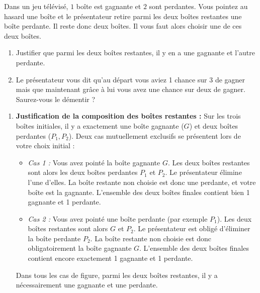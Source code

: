 \documentclass[11pt,a4paper]{article}
\begin{document}
Dans un jeu télévisé, $1$ boîte est gagnante et $2$ sont perdantes. Vous pointez au hasard une boîte et le présentateur retire parmi les deux boîtes restantes une boîte perdante. Il reste donc deux boîtes. Il vous faut alors choisir une de ces deux boîtes.
\begin{enumerate}[label=\arabic*.]
    \item Justifier que parmi les deux boîtes restantes, il y en a une gagnante et l'autre perdante.
    \item Le présentateur vous dit qu'au départ vous aviez 1 chance sur 3 de gagner mais que maintenant grâce à lui vous avez une chance sur deux de gagner. Saurez-vous le démentir ?
\end{enumerate}

\begin{correctionbox}
\begin{enumerate}[label=\arabic*.]
    \item \textbf{Justification de la composition des boîtes restantes :}
    Sur les trois boîtes initiales, il y a exactement une boîte gagnante ($G$) et deux boîtes perdantes ($P_1, P_2$).
    Deux cas mutuellement exclusifs se présentent lors de votre choix initial :
    \begin{itemize}[label=$\bullet$]
        \item \emph{Cas 1 :} Vous avez pointé la boîte gagnante $G$. Les deux boîtes restantes sont alors les deux boîtes perdantes $P_1$ et $P_2$. Le présentateur élimine l'une d'elles. La boîte restante non choisie est donc une perdante, et votre boîte est la gagnante. L'ensemble des deux boîtes finales contient bien 1 gagnante et 1 perdante.
        \item \emph{Cas 2 :} Vous avez pointé une boîte perdante (par exemple $P_1$). Les deux boîtes restantes sont alors $G$ et $P_2$. Le présentateur est obligé d'éliminer la boîte perdante $P_2$. La boîte restante non choisie est donc obligatoirement la boîte gagnante $G$. L'ensemble des deux boîtes finales contient encore exactement 1 gagnante et 1 perdante.
    \end{itemize}
    Dans tous les cas de figure, parmi les deux boîtes restantes, il y a nécessairement une gagnante et une perdante.


\end{enumerate}
\end{correctionbox}
\end{document}
